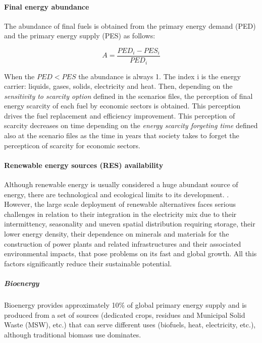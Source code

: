 
\paragraph{Final energy abundance}

The abundance of final fuels is obtained from the primary energy demand (PED) and the primary energy supply (PES) as follows:

\begin{equation}
A= \frac{PED_i-PES_i}{PED_i}
\label{eq:abundance-final-fuels}
\end{equation}

When the $PED<PES$ the abundance is always 1. The index i is the energy carrier: liquids, gases, solids, electricity and heat.
Then, depending on the \emph{sensitivity to scarcity option} defined in the scenarios files, the perception of final energy scarcity of each fuel by economic sectors is obtained. This perception drives the fuel replacement and efficiency improvement. This perception of scarcity decreases on time depending on the \emph{energy scarcity forgeting time} defined also at the scenario files as the time in years that society takes to forget the percepticon of scarcity for economic sectors.

\paragraph{Renewable energy sources (RES) availability}

Although renewable energy is usually considered a huge abundant source of energy, there are technological and ecological limits to its development. . However, the large scale deployment of renewable alternatives faces serious challenges in relation to their integration in the electricity mix due to their intermittency, seasonality and uneven spatial distribution requiring storage, their lower energy density, their dependence on minerals and materials for the construction of power plants and related infrastructures and their associated environmental impacts, that pose problems on its fast and global growth. All this factors significantly reduce their sustainable potential.

\subparagraph{Bioenergy}
Bioenergy provides approximately 10\% of global primary energy supply and is produced from a set of sources (dedicated crops, residues and Municipal Solid Waste (MSW), etc.) that can serve different uses (biofuels, heat, electricity, etc.), although traditional biomass use dominates. 

